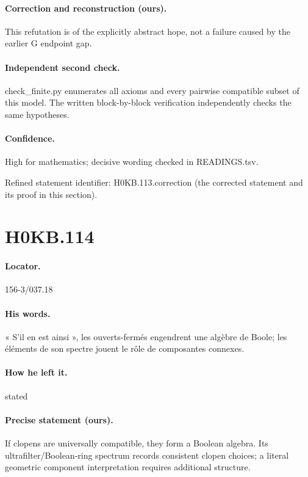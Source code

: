 \paragraph{Correction and reconstruction (ours).} This refutation is of the explicitly abstract hope, not a failure caused by the earlier G endpoint gap.

\paragraph{Independent second check.} check\_finite.py enumerates all axioms and every pairwise compatible subset of this model. The written block-by-block verification independently checks the same hypotheses.

\paragraph{Confidence.} High for mathematics; decisive wording checked in READINGS.tsv.

\noindent Refined statement identifier: H0KB.113.correction (the corrected statement and its proof in this section).

\section*{H0KB.114}\label{statement:H0KB.114}
\paragraph{Locator.} 156-3/037.18

\paragraph{His words.} « S’il en est ainsi », les ouverts-fermés engendrent une algèbre de Boole; les éléments de son spectre jouent le rôle de composantes connexes.

\paragraph{How he left it.} stated

\paragraph{Precise statement (ours).} If clopens are universally compatible, they form a Boolean algebra. Its ultrafilter/Boolean-ring spectrum records consistent clopen choices; a literal geometric component interpretation requires additional structure.

